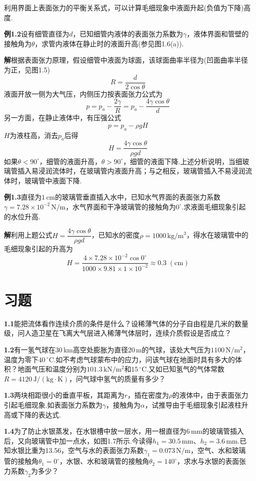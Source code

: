利用界面上表面张力的平衡关系式，可以计算毛细现象中液面升起(负值为下降)高度.

\noindent\textbf{例1.2}\quad 设有细管直径为$d$，已知细管内液体的表面张力系数为$\gamma$，液体界面和管壁的接触角为$\theta$，求管内液体在静止时的液面升高(参见图1.6(a)).

\noindent\textbf{解}\quad 根据表面张力原理，假设细管中液面为球面，该球面曲率半径为(凹面曲率半径为正，见图1.5)
\[
R=\frac{d}{2\cos\theta}
\]
液面开放一侧为大气压，内侧压力按表面张力公式为
\[
p=p_a-\frac{2\gamma}{R}=p_a-\frac{4\gamma\cos\theta}{d}
\]
另一方面，在静止液体中，有压强公式
\[
p=p_a-\rho g H
\]
$H$为液柱高，消去$p_a$后得
\[
H=\frac{4\gamma\cos\theta}{\rho g d}
\]
如果$\theta<90^\circ$，细管的液面升高，$\theta>90^\circ$，细管的液面下降.上述分析说明，当细玻璃管插入易浸润流体时，在玻璃管内液面升高；与之相反，玻璃管插入不易浸润流体时，玻璃管中液面下降.

\noindent\textbf{例1.3}\quad 直径为$1\,$cm的玻璃管垂直插入水中，已知水气界面的表面张力系数$\gamma=7.28\times 10^{-2}\,\mathrm{N/m}$，水气界面和干净玻璃管的接触角为$0^\circ$.求液面毛细现象引起的水位升高.

\noindent\textbf{解}\quad 利用上题公式$H=\dfrac{4\gamma\cos\theta}{\rho g d}$，已知水的密度$\rho=1000\,\mathrm{kg/m^3}$，得水在玻璃管中的毛细现象引起的升高为
\[
H=\frac{4\times 7.28\times 10^{-2}\cos 0^{\circ}}{1000\times 9.81\times 1\times 10^{-2}}\approx 0.3\;(\mathrm{cm})
\]

\section*{习题}

\noindent\textbf{1.1}\quad 能把流体看作连续介质的条件是什么？设稀薄气体的分子自由程是几米的数量级，问人造卫星在飞离大气层进入稀薄气体层时，连续介质假设是否成立？

\medskip
\noindent\textbf{1.2}\quad 有一氢气球在$30\,$km高空处膨胀为直径$20\,$m的气球，该处大气压为$1100\,\mathrm{N/m^2}$，温度为零下$40\,^\circ$C.如不考虑气球蒙布中的应力，问该气球在地面时具有多大的体积？地面气压和温度分别为$101.3\,\mathrm{kN/m^2}$和$15\,^\circ$C.又如已知氢气的气体常数$R=4120\,\mathrm{J/(kg\cdot K)}$，问气球中氢气的质量有多少？

\medskip
\noindent\textbf{1.3}\quad 两块相距很小的垂直平板，其距离为$r$，插在密度为$\rho$的液体中，由于表面张力引起毛细现象.如表面张力系数为$\gamma$，接触角为$\alpha$，试推导由于毛细现象引起液柱升高或下降的表达式.

\medskip
\noindent\textbf{1.4}\quad 为了防止水银蒸发，在水银槽中放一层水，用一根直径为$6\,$mm的玻璃管插入后，又向玻璃管中加一点水，如图1.7所示.今读得$h_1=30.5\,$mm、$h_2=3.6\,$mm.已知水银比重为13.56，空气与水的表面张力系数$\gamma_1=0.073\,\mathrm{N/m}$，空气、水和玻璃管的接触角$\theta_1=0^\circ$，水银、水和玻璃管的接触角$\theta_2=140^\circ$，求水与水银的表面张力系数$\gamma_2$为多少？

